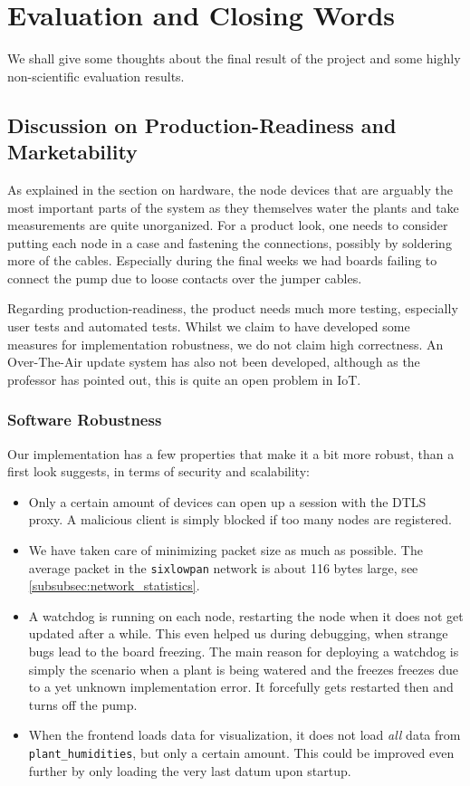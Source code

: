 \documentclass[acmtog, language=english, nonacm]{acmart}
\begin{document}
    \section{Evaluation and Closing Words}

    We shall give some thoughts about the final result of the project and some highly non-scientific evaluation results.

    \subsection{Discussion on Production-Readiness and Marketability}

    As explained in the section on hardware, the node devices that are arguably the most important parts of the system as they themselves water the plants and take measurements are quite unorganized. For a product look, one needs to consider putting each node in a case and fastening the connections, possibly by soldering more of the cables. Especially during the final weeks we had boards failing to connect the pump due to loose contacts over the jumper cables.

    Regarding production-readiness, the product needs much more testing, especially user tests and automated tests. Whilst we claim to have developed some measures for implementation robustness, we do not claim high correctness. An Over-The-Air update system has also not been developed, although as the professor has pointed out, this is quite an open problem in IoT.

    \subsubsection{Software Robustness}

    Our implementation has a few properties that make it a bit more robust, than a first look suggests, in terms of security and scalability:
    \begin{itemize}
        \item Only a certain amount of devices can open up a session with the DTLS proxy. A malicious client is simply blocked if too many nodes are registered.
        \item We have taken care of minimizing packet size as much as possible. The average packet in the \texttt{sixlowpan} network is about 116 bytes large, see \cref{subsubsec:network_statistics}.
        \item A watchdog is running on each node, restarting the node when it does not get updated after a while. This even helped us during debugging, when strange bugs lead to the board freezing. The main reason for deploying a watchdog is simply the scenario when a plant is being watered and the freezes freezes due to a yet unknown implementation error. It forcefully gets restarted then and turns off the pump.
        \item When the frontend loads data for visualization, it does not load \emph{all} data from \texttt{plant\_humidities}, but only a certain amount. This could be improved even further by only loading the very last datum upon startup.
    \end{itemize}
\end{document}
